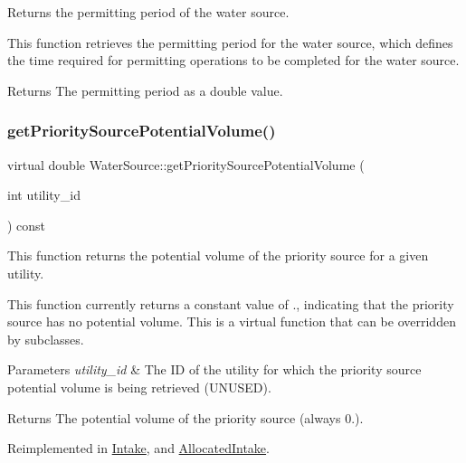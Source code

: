 Returns the permitting period of the water source. 

This function retrieves the permitting period for the water source, which defines the time required for permitting operations to be completed for the water source.

\begin{DoxyReturn}{Returns}
The permitting period as a double value. 
\end{DoxyReturn}
\mbox{\label{classWaterSource_a00a432eba75eaae7195338a8514ac853}} 
\subsubsection{\texorpdfstring{get\+Priority\+Source\+Potential\+Volume()}{getPrioritySourcePotentialVolume()}}
{\footnotesize\ttfamily virtual double Water\+Source\+::get\+Priority\+Source\+Potential\+Volume (\begin{DoxyParamCaption}\item[{int}]{utility\+\_\+id }\end{DoxyParamCaption}) const\hspace{0.3cm}{\ttfamily [virtual]}}



This function returns the potential volume of the priority source for a given utility. 

This function currently returns a constant value of {.}, indicating that the priority source has no potential volume. This is a virtual function that can be overridden by subclasses.


\begin{DoxyParams}{Parameters}
{\em utility\+\_\+id} & The ID of the utility for which the priority source potential volume is being retrieved (U\+N\+U\+S\+ED).\\
\hline
\end{DoxyParams}
\begin{DoxyReturn}{Returns}
The potential volume of the priority source (always 0.). 
\end{DoxyReturn}


Reimplemented in \mbox{\hyperlink{classIntake_a8d1fc6855451f3dff1a2f0efcd5da8ee}{Intake}}, and \mbox{\hyperlink{classAllocatedIntake_abbea26f2adac6c9f9e3bdcdf1aead55d}{Allocated\+Intake}}.

